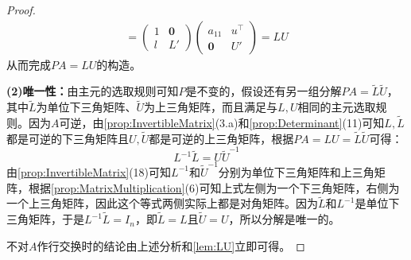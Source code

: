 \begin{proof}
\begin{align*}
		= \begin{pmatrix} 1 & \mathbf{0} \\ l & L' \end{pmatrix}
		\begin{pmatrix} a_{11} & u^{\top} \\ \mathbf{0} & U' \end{pmatrix} = L U
	\end{align*} 
	从而完成$PA=LU$的构造。\par
	\textbf{(2)唯一性：}由主元的选取规则可知$P$是不变的，假设还有另一组分解$PA=\tilde{L}\tilde{U}$，其中$\tilde{L}$为单位下三角矩阵、$\tilde{U}$为上三角矩阵，而且满足与$L,U$相同的主元选取规则。因为$A$可逆，由\cref{prop:InvertibleMatrix}(3.a)和\cref{prop:Determinant}(11)可知$L,\tilde{L}$都是可逆的下三角矩阵且$U,\tilde{U}$都是可逆的上三角矩阵，根据$PA=LU=\tilde{L}\tilde{U}$可得：
	\[ L^{-1}\tilde{L} = U \tilde{U}^{-1}\] 
	由\cref{prop:InvertibleMatrix}(18)可知$L^{-1}$和$\tilde{U}^{-1}$分别为单位下三角矩阵和上三角矩阵，根据\cref{prop:MatrixMultiplication}(6)可知上式左侧为一个下三角矩阵，右侧为一个上三角矩阵，因此这个等式两侧实际上都是对角矩阵。因为$\tilde{L}$和$L^{-1}$是单位下三角矩阵，于是$L^{-1}\tilde{L}=I_n$，即$\tilde{L}=L$且$\tilde{U}=U$，所以分解是唯一的。\par
	不对$A$作行交换时的结论由上述分析和\cref{lem:LU}立即可得。
\end{proof}
